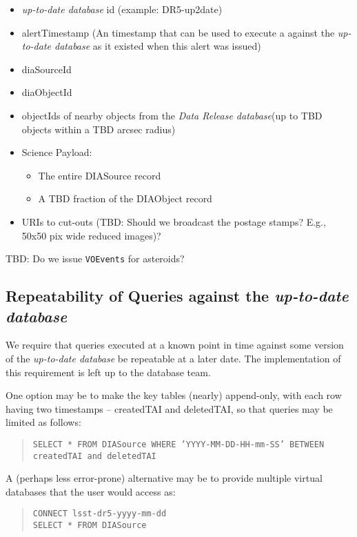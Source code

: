 \documentclass[12pt]{article}
\newcommand{\code}[1]{\texttt{#1}}
\newcommand{\DB}{{\em up-to-date database}\xspace}
\newcommand{\DR}{{\em Data Release database}\xspace}
\newcommand{\VOEvents}{\code{VOEvents}\xspace}
\begin{document}
\begin{itemize}
\item \DB id (example: DR5-up2date)
\item alertTimestamp (An timestamp that can be used to execute a against the \DB as it existed when this alert was issued)
\item diaSourceId
\item diaObjectId
\item objectIds of nearby objects from the \DR (up to TBD objects within a TBD arcsec radius)
\item Science Payload:
	\begin{itemize}
    \item The entire DIASource record
  	\item A TBD fraction of the DIAObject record
    \end{itemize}
\item URIs to cut-outs (TBD: Should we broadcast the postage stamps? E.g., 50x50 pix wide reduced images)?
\end{itemize}

TBD: Do we issue \VOEvents for asteroids?

\subsection{Repeatability of Queries against the \DB}

We require that queries executed at a known point in time against some version of the \DB be repeatable at a later date. The implementation of this requirement is left up to the database team.

One option may be to make the key tables (nearly) append-only, with each row having two timestamps -- createdTAI and deletedTAI, so that queries may be limited as follows:

\begin{quote}
\texttt{SELECT * FROM DIASource WHERE 'YYYY-MM-DD-HH-mm-SS' BETWEEN createdTAI and deletedTAI}
\end{quote}

A (perhaps less error-prone) alternative may be to provide multiple virtual databases that the user would access as:

\begin{quote}
\texttt{CONNECT lsst-dr5-yyyy-mm-dd} \\
\texttt{SELECT * FROM DIASource}
\end{quote}
\end{document}
